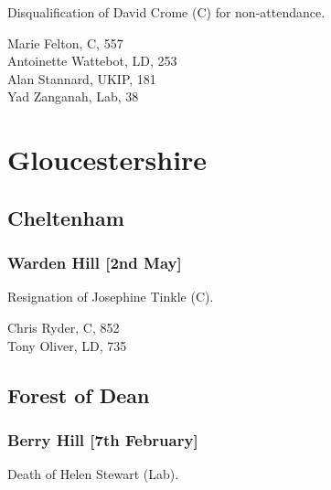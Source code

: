 \documentclass[a4paper,openany,10pt]{book}
\begin{document}

Disqualification of David Crome (C) for non-attendance.



Marie Felton, C, 557\\
Antoinette Wattebot, LD, 253\\
Alan Stannard, UKIP, 181\\
Yad Zanganah, Lab, 38\\


\vfill

\section[Gloucestershire]{{Gloucestershire}}

\subsection*{Cheltenham}

\subsubsection*{Warden Hill \hspace*{\fill}\nolinebreak[1]%
\enspace\hspace*{\fill}
[2nd May]}


Resignation of Josephine Tinkle (C).



Chris Ryder, C, 852\\
Tony Oliver, LD, 735\\


\subsection*{Forest of Dean}

\subsubsection*{Berry Hill \hspace*{\fill}\nolinebreak[1]%
\enspace\hspace*{\fill}
[7th February]}


Death of Helen Stewart (Lab).
\end{document}
